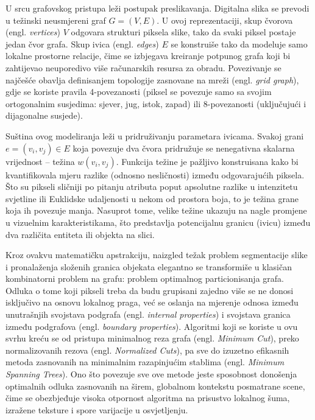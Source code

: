 \documentclass[11pt,a4paper]{article}
\begin{document}
U srcu grafovskog pristupa leži postupak preslikavanja. Digitalna slika se prevodi u težinski neusmjereni graf $G = (V, E)$. U ovoj reprezentaciji, skup čvorova (engl. \textit{vertices}) $V$ odgovara strukturi piksela slike, tako da svaki piksel postaje jedan čvor grafa. Skup ivica (engl. \textit{edges}) $E$ se konstruiše tako da modeluje samo lokalne prostorne relacije, čime se izbjegava kreiranje potpunog grafa koji bi zahtijevao neuporedivo više računarskih resursa za obradu. Povezivanje se najčešće obavlja definisanjem topologije zasnovane na mreži (engl. \textit{grid graph}), gdje se koriste pravila 4-povezanosti (piksel se povezuje samo sa svojim ortogonalnim susjedima: sjever, jug, istok, zapad) ili 8-povezanosti (uključujući i dijagonalne susjede).

Suština ovog modeliranja leži u pridruživanju parametara ivicama. Svakoj grani $e = (v_i, v_j) \in E$ koja povezuje dva čvora pridružuje se nenegativna skalarna vrijednost – težina $w(v_i, v_j)$. Funkcija težine je pažljivo konstruisana kako bi kvantifikovala mjeru razlike (odnosno nesličnosti) između odgovarajućih piksela. Što su pikseli sličniji po pitanju atributa poput apsolutne razlike u intenzitetu svjetline ili Euklidske udaljenosti u nekom od prostora boja, to je težina grane koja ih povezuje manja. Nasuprot tome, velike težine ukazuju na nagle promjene u vizuelnim karakteristikama, što predstavlja potencijalnu granicu (ivicu) između dva različita entiteta ili objekta na slici. 

Kroz ovakvu matematičku apstrakciju, naizgled težak problem segmentacije slike i pronalaženja složenih granica objekata elegantno se transformiše u klasičan kombinatorni problem na grafu: problem optimalnog particionisanja grafa. Odluka o tome koji pikseli treba da budu grupisani zajedno više se ne donosi isključivo na osnovu lokalnog praga, već se oslanja na mjerenje odnosa između unutrašnjih svojstava podgrafa (engl. \textit{internal properties}) i svojstava granica između podgrafova (engl. \textit{boundary properties}). Algoritmi koji se koriste u ovu svrhu kreću se od pristupa minimalnog reza grafa (engl. \textit{Minimum Cut}), preko normalizovanih rezova (engl. \textit{Normalized Cuts}), pa sve do izuzetno efikasnih metoda zasnovanih na minimalnim razapinjućim stablima (engl. \textit{Minimum Spanning Trees}). Ono što povezuje sve ove metode jeste sposobnost donošenja optimalnih odluka zasnovanih na širem, globalnom kontekstu posmatrane scene, čime se obezbjeđuje visoka otpornost algoritma na prisustvo lokalnog šuma, izražene teksture i spore varijacije u osvjetljenju.
\end{document}
